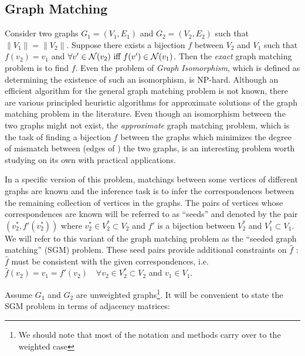 \documentclass[12pt,oneside,final]{thesis}
\begin{document}
\subsection{Graph Matching}
Consider two  graphs $G_1=(V_1,E_1)$ and $G_2=(V_2,E_2)$   such that $\| V_1 \|=\| V_2 \|$. Suppose there exists a bijection $f$  between $V_2$ and $V_1$ such that $f(v_2)=v_1$ and $\forall v' \in \mathcal{N}(v_2) \textrm{ iff } f(v') \in \mathcal{N}(v_1)$. Then the \emph{exact} graph matching problem  is to find $f$. Even the problem of \emph{Graph Isomorphism}, which is defined as determining the existence  of such an isomorphism, is NP-hard.  Although an efficient algorithm  for the general  graph matching problem is not known, there are various principled heuristic algorithms for  approximate solutions of the graph matching problem  in the literature\cite{GraphMatchReview}.
Even though an isomorphism between the two graphs might not exist,  the \emph{approximate} graph matching problem, which is the task of  finding a bijection $f$ between the
graphs which minimizes the degree  of mismatch   between  (edges of ) the two graphs, is an interesting problem  worth studying on its own with practical applications\cite{GraphMatchReview,Bengoetxea2002,recentdevGraphMatching2000,VogConGraphMatchFAQ,Zaslavskiy2009}.


In a specific version of this problem, matchings between some vertices of different graphs are known  and  the  inference task is to infer the correspondences between the remaining collection of vertices in the graphs.  The pairs of vertices whose correspondences are known will be referred to as ``seeds'' and denoted by the pair $(v_2^*,f'(v_2^*)) $  where $v_2^* \in V_2^{*} \subset V_2$ and $f'$ is a bijection between  $V_2^{*}$ and $V_1^{*}\subset V_1$. We will refer to this variant of the graph matching problem as the ``seeded graph matching'' (SGM) problem. These seed pairs provide additional constraints on $\hat{f}$ : $\hat{f}$ must be consistent with the given correspondences, i.e.  $\hat{f}(v_2)=v_1=f'(v_2)\quad \forall v_2 \in V_2^{*} \subset V_2$ and $v_1 \in V_1$. 

Assume $G_1$ and $G_2$ are unweighted graphs\footnote{We should note that most of the notation and methods carry over to the weighted case}. It will be convenient to state the SGM problem in terms of adjacency matrices:
\end{document}
